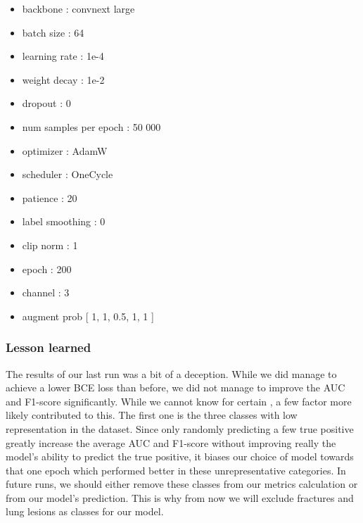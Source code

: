 \documentclass[11pt]{article}
\begin{document}
            \begin{multicols}{2}

            \begin{itemize}
                \centering %
                \item backbone : convnext large
                \item batch size : 64
                \item learning rate : 1e-4
                \item weight decay : 1e-2
                \item dropout : 0
                \item num samples per epoch : 50 000
                \item optimizer : AdamW
                \item scheduler : OneCycle
                \item patience : 20
                \item label smoothing : 0
                \item clip norm : 1
                \item epoch : 200
                \item channel : 3
                \item augment prob [ 1, 1, 0.5, 1, 1 ]
            \end{itemize}
            \end{multicols}
        \subsubsection{Lesson learned}
            The results of our last run was a bit of a deception. While we did manage to achieve a lower BCE loss than before,
            we did not manage to improve the AUC and F1-score significantly. While we cannot know for certain , a few factor more
            likely contributed to this. The first one is the three classes with low representation in the dataset. Since only randomly predicting
            a few true positive greatly increase the average AUC and F1-score without improving really the model's ability to predict the true positive,
            it biases our choice of model towards that one epoch which performed better in these unrepresentative categories.
            In future runs, we should either remove these classes from our metrics calculation or from our model's prediction. This is why from now we will exclude fractures
            and lung lesions as classes for our model.
\end{document}

